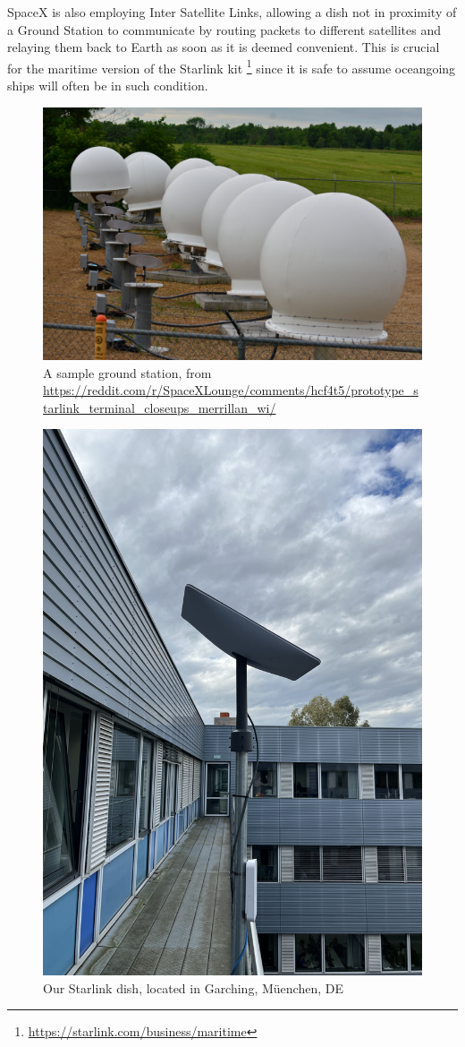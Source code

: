 \documentclass[IN,11pt,twoside,openright,idp,english]{tumthesis}
\begin{document}
SpaceX is also employing Inter Satellite Links, allowing a dish not in proximity of a Ground Station to communicate by routing packets to different satellites and relaying them back to Earth as soon as it is deemed convenient. This is crucial for the maritime version of the Starlink kit \footnote{\url{https://starlink.com/business/maritime}} since it is safe to assume oceangoing ships will often be in such condition.
   
\begin{figure}
    \centering
    \includegraphics[width=0.6\columnwidth]{img/ground-station.jpeg}
    \caption{A sample ground station, from \small\protect\url{https://reddit.com/r/SpaceXLounge/comments/hcf4t5/prototype_starlink_terminal_closeups_merrillan_wi/}}
    \label{fig:gs}
\end{figure}
    
\begin{figure}
    \centering
    \includegraphics[width=0.6\columnwidth]{img/dish.jpeg}
    \caption{Our Starlink dish, located in Garching, Müenchen, DE}
    \label{fig:dish}
\end{figure}
    
\end{document}
